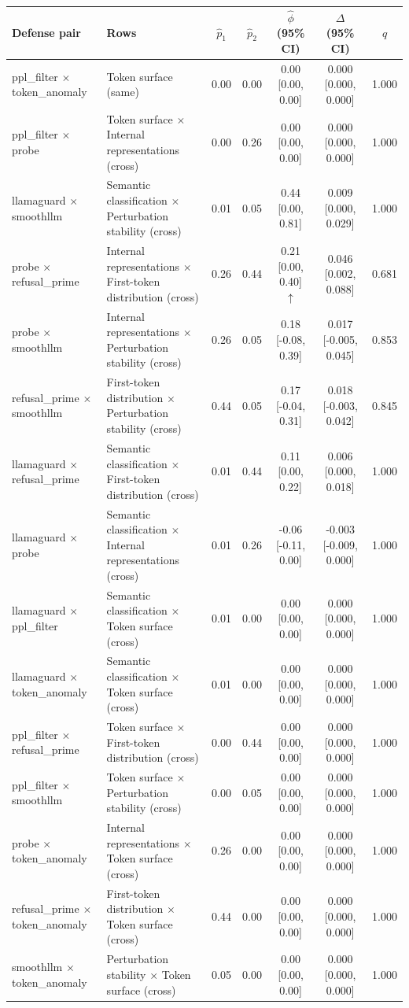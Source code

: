 \begin{tabular}{llccccc}
\toprule
Defense pair & Rows & $\hat p_1$ & $\hat p_2$ & $\hat\phi$ (95\% CI) & $\Delta$ (95\% CI) & $q$ \\
\midrule
ppl_filter $\times$ token_anomaly & Token surface (same) & 0.00 & 0.00 & 0.00 [0.00, 0.00]  & 0.000 [0.000, 0.000] & 1.000 \\
ppl_filter $\times$ probe & Token surface $\times$ Internal representations (cross) & 0.00 & 0.26 & 0.00 [0.00, 0.00]  & 0.000 [0.000, 0.000] & 1.000 \\
llamaguard $\times$ smoothllm & Semantic classification $\times$ Perturbation stability (cross) & 0.01 & 0.05 & 0.44 [0.00, 0.81]  & 0.009 [0.000, 0.029] & 1.000 \\
probe $\times$ refusal_prime & Internal representations $\times$ First-token distribution (cross) & 0.26 & 0.44 & 0.21 [0.00, 0.40] $\uparrow$ & 0.046 [0.002, 0.088] & 0.681 \\
probe $\times$ smoothllm & Internal representations $\times$ Perturbation stability (cross) & 0.26 & 0.05 & 0.18 [-0.08, 0.39]  & 0.017 [-0.005, 0.045] & 0.853 \\
refusal_prime $\times$ smoothllm & First-token distribution $\times$ Perturbation stability (cross) & 0.44 & 0.05 & 0.17 [-0.04, 0.31]  & 0.018 [-0.003, 0.042] & 0.845 \\
llamaguard $\times$ refusal_prime & Semantic classification $\times$ First-token distribution (cross) & 0.01 & 0.44 & 0.11 [0.00, 0.22]  & 0.006 [0.000, 0.018] & 1.000 \\
llamaguard $\times$ probe & Semantic classification $\times$ Internal representations (cross) & 0.01 & 0.26 & -0.06 [-0.11, 0.00]  & -0.003 [-0.009, 0.000] & 1.000 \\
llamaguard $\times$ ppl_filter & Semantic classification $\times$ Token surface (cross) & 0.01 & 0.00 & 0.00 [0.00, 0.00]  & 0.000 [0.000, 0.000] & 1.000 \\
llamaguard $\times$ token_anomaly & Semantic classification $\times$ Token surface (cross) & 0.01 & 0.00 & 0.00 [0.00, 0.00]  & 0.000 [0.000, 0.000] & 1.000 \\
ppl_filter $\times$ refusal_prime & Token surface $\times$ First-token distribution (cross) & 0.00 & 0.44 & 0.00 [0.00, 0.00]  & 0.000 [0.000, 0.000] & 1.000 \\
ppl_filter $\times$ smoothllm & Token surface $\times$ Perturbation stability (cross) & 0.00 & 0.05 & 0.00 [0.00, 0.00]  & 0.000 [0.000, 0.000] & 1.000 \\
probe $\times$ token_anomaly & Internal representations $\times$ Token surface (cross) & 0.26 & 0.00 & 0.00 [0.00, 0.00]  & 0.000 [0.000, 0.000] & 1.000 \\
refusal_prime $\times$ token_anomaly & First-token distribution $\times$ Token surface (cross) & 0.44 & 0.00 & 0.00 [0.00, 0.00]  & 0.000 [0.000, 0.000] & 1.000 \\
smoothllm $\times$ token_anomaly & Perturbation stability $\times$ Token surface (cross) & 0.05 & 0.00 & 0.00 [0.00, 0.00]  & 0.000 [0.000, 0.000] & 1.000 \\
\bottomrule
\end{tabular}